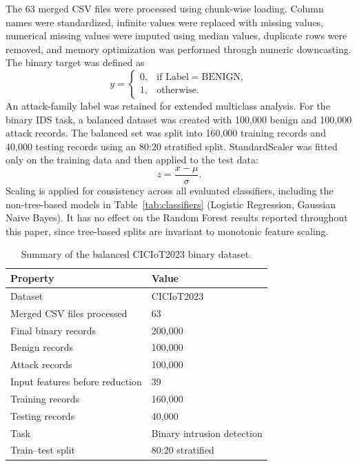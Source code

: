 \documentclass[11pt,a4paper]{article}
\begin{document}
The 63 merged CSV files were processed using chunk-wise loading. Column
names were standardized, infinite values were replaced with missing
values, numerical missing values were imputed using median values,
duplicate rows were removed, and memory optimization was performed
through numeric downcasting. The binary target was defined as
%
\begin{equation}
y =
\begin{cases}
0, & \text{if } \mathrm{Label} = \mathrm{BENIGN},\\
1, & \text{otherwise.}
\end{cases}
\end{equation}
%
An attack-family label was retained for extended multiclass analysis.
For the binary IDS task, a balanced dataset was created with 100{,}000
benign and 100{,}000 attack records. The balanced set was split into
160{,}000 training records and 40{,}000 testing records using an 80:20
stratified split. StandardScaler was fitted only on the training data
and then applied to the test data:
%
\begin{equation}
z = \frac{x - \mu}{\sigma}.
\end{equation}
%
Scaling is applied for consistency across all evaluated classifiers,
including the non-tree-based models in Table~\ref{tab:classifiers}
(Logistic Regression, Gaussian Naive Bayes). It has no effect on the
Random Forest results reported throughout this paper, since tree-based
splits are invariant to monotonic feature scaling.

\begin{table}[!t]
\centering
\caption{Summary of the balanced CICIoT2023 binary dataset.}
\label{tab:dataset}
\small
\begin{tabular}{ll}
\toprule
\textbf{Property} & \textbf{Value} \\
\midrule
Dataset & CICIoT2023 \\
Merged CSV files processed & 63 \\
Final binary records & 200{,}000 \\
Benign records & 100{,}000 \\
Attack records & 100{,}000 \\
Input features before reduction & 39 \\
Training records & 160{,}000 \\
Testing records & 40{,}000 \\
Task & Binary intrusion detection \\
Train--test split & 80:20 stratified \\
\bottomrule
\end{tabular}
\end{table}
\end{document}
